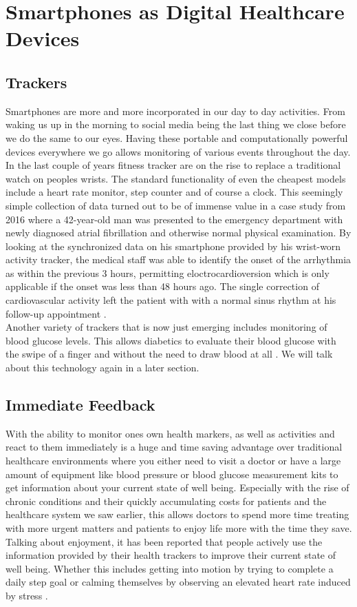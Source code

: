 \section{Smartphones as Digital Healthcare Devices}
\label{sec:smartphoneChances}
\subsection{Trackers}
Smartphones are more and more incorporated in our day to day activities. From waking us up in the morning to social media being the last thing we close before we do the same to our eyes. Having these portable and computationally powerful devices everywhere we go allows monitoring of various events throughout the day. In the last couple of years fitness tracker are on the rise to replace a traditional watch on peoples wrists. The standard functionality of even the cheapest models include a heart rate monitor, step counter and of course a clock. This seemingly simple collection of data turned out to be of immense value in a case study from 2016 where a 42-year-old man was presented to the emergency department with newly diagnosed atrial fibrillation and otherwise normal physical examination. By looking at the synchronized data on his smartphone provided by his wrist-worn activity tracker, the medical staff was able to identify the onset of the arrhythmia as within the previous 3 hours, permitting eloctrocardioversion which is only applicable if the onset was less than 48 hours ago. The single correction of cardiovascular activity left the patient with with a normal sinus rhythm at his follow-up appointment \cite{rudner2016interrogation}. \\
Another variety of trackers that is now just emerging includes monitoring of blood glucose levels. This allows diabetics to evaluate their blood glucose with the swipe of a finger and without the need to draw blood at all \cite{glucoseTracker}. We will talk about this technology again in a later section.
\subsection{Immediate Feedback}
With the ability to monitor ones own health markers, as well as activities and react to them immediately is a huge and time saving advantage over traditional healthcare environments where you either need to visit a doctor or have a large amount of equipment like blood pressure or blood glucose measurement kits to get information about your current state of well being. Especially with the rise of chronic conditions and their quickly accumulating costs for patients and the healthcare system we saw earlier, this allows doctors to spend more time treating with more urgent matters and patients to enjoy life more with the time they save. Talking about enjoyment, it has been reported that people actively use the information provided by their health trackers to improve their current state of well being. Whether this includes getting into motion by trying to complete a daily step goal \cite{rasche2015activity} or calming themselves by observing an elevated heart rate induced by stress \cite{mayya2015continuous}.
